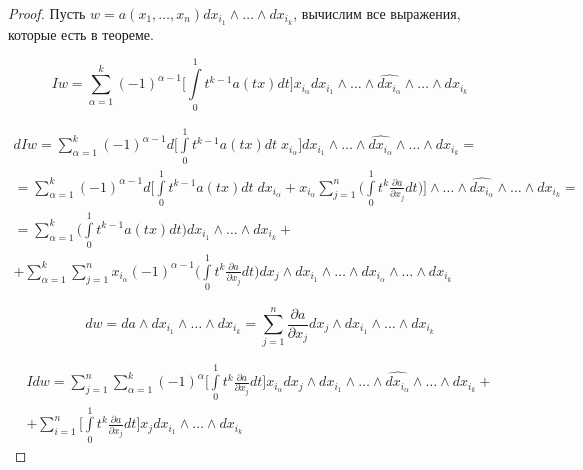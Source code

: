 \documentclass[a5paper]{article}
\theoremstyle{plain}
\theoremstyle{definition}
\numberwithin{through}{section}
\numberwithin{equation}{section}
\begin{document}
\begin{proof}
	Пусть $w=a(x_1, \ldots, x_n) dx_{i_1} \wedge \ldots \wedge dx_{i_k}$, вычислим все выражения, которые есть в теореме.
	
	\begin{equation*}
		Iw = \sum\limits_{\alpha = 1}^{k} (-1)^{\alpha - 1} \bigg[\int\limits_{0}^{1} t^{k-1}a(tx)dt\bigg] x_{i_{\alpha}} dx_{i_1} \wedge \ldots \wedge \widehat{dx_{i_{\alpha}}} \wedge \ldots \wedge dx_{i_k}
	\end{equation*}
	
	\begin{multline*}
		dIw = \sum\limits_{\alpha = 1}^{k} (-1)^{\alpha - 1} d\bigg[\int\limits_{0}^{1} t^{k-1}a(tx)dt \; x_{i_{\alpha}} \bigg] dx_{i_1} \wedge \ldots \wedge \widehat{dx_{i_{\alpha}}} \wedge \ldots \wedge dx_{i_k} = \\ =  \sum\limits_{\alpha = 1}^{k} (-1)^{\alpha - 1} d\bigg[\int\limits_{0}^{1} t^{k-1}a(tx)dt \; dx_{i_{\alpha}} + x_{i_{\alpha}} \sum\limits_{j=1}^{n}  \bigg( \int\limits_{0}^{1} t^{k} \frac{\partial a}{\partial x_j} dt \bigg) \bigg] \wedge \ldots \wedge \widehat{dx_{i_{\alpha}}} \wedge \ldots \wedge dx_{i_k} = \\ = \sum\limits_{\alpha = 1}^{k} \bigg( \int\limits_{0}^{1} t^{k-1}a(tx)dt \bigg) dx_{i_1} \wedge \ldots  \wedge dx_{i_k} + \\ + \sum\limits_{\alpha = 1}^{k} \sum\limits_{j = 1}^{n} x_{i_{\alpha}} (-1)^{\alpha - 1} \bigg( \int\limits_{0}^{1} t^{k} \frac{\partial a}{\partial x_j} dt \bigg) dx_j \wedge dx_{i_1} \wedge \ldots \wedge dx_{i_{\alpha}} \wedge \ldots \wedge dx_{i_k}
	\end{multline*}
	
	\begin{equation*}
		dw = da \wedge dx_{i_1} \wedge \ldots \wedge dx_{i_k} = \sum\limits_{j = 1}^{n} \frac{\partial a}{\partial x_j} dx_j  \wedge dx_{i_1} \wedge \ldots \wedge dx_{i_k}
	\end{equation*}
	
	\begin{multline*}
		Idw = \sum\limits_{j = 1}^{n} \sum\limits_{\alpha = 1}^{k} (-1)^{\alpha} \bigg[ \int\limits_{0}^{1} t^{k} \frac{\partial a}{\partial x_j} dt \bigg] x_{i_{\alpha}} dx_j \wedge dx_{i_1} \wedge \ldots \wedge \widehat{dx_{i_{\alpha}}} \wedge \ldots \wedge dx_{i_k} + \\ + \sum\limits_{i = 1}^{n} \bigg[ \int\limits_{0}^{1} t^{k} \frac{\partial a}{\partial x_j} dt \bigg] x_j dx_{i_1} \wedge \ldots \wedge dx_{i_k}
	\end{multline*}
	

\end{proof}
\end{document}
